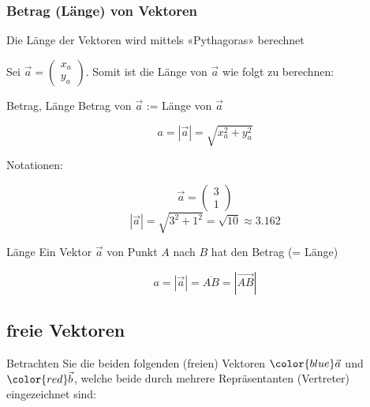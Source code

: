 \newpage


\subsubsection{Betrag (Länge) von Vektoren}
Die Länge der Vektoren wird mittels «Pythagoras» berechnet

Sei $\vec{a}  = \begin{pmatrix}x_a\\y_a\end{pmatrix}$. Somit ist die Länge von
    $\vec{a}$ wie folgt zu berechnen:

    \begin{gesetz}{Betrag, Länge}{}
      Betrag von $\vec{a}$ := Länge von $\vec{a}$

      $$a = |\vec{a}| = \sqrt{x_a^2 + y_a^2}$$
      \end{gesetz}
    Notationen:

    \begin{beispiel}{}{}
      $$ \vec{a}= \begin{pmatrix} 3\\ 1\end{pmatrix}$$
        $$|\vec{a}| = \sqrt{3^2+1^2} = \sqrt{10}\approx 3.162$$
      \end{beispiel}
    
    \begin{definition}{Länge}{}
      Ein Vektor $\vec{a}$ von Punkt $A$ nach $B$ hat den Betrag (= Länge)

      $$a = |\vec{a}| = \overline{AB} = \left|\overrightarrow{AB}\right|$$
    \end{definition}

\newpage



\subsection{freie Vektoren}
Betrachten Sie die beiden folgenden (freien) Vektoren ${\color{blue} \vec{a}}$ und
${\color{red}\vec{b}}$, welche beide durch mehrere Repräsentanten
(Vertreter) eingezeichnet sind:


